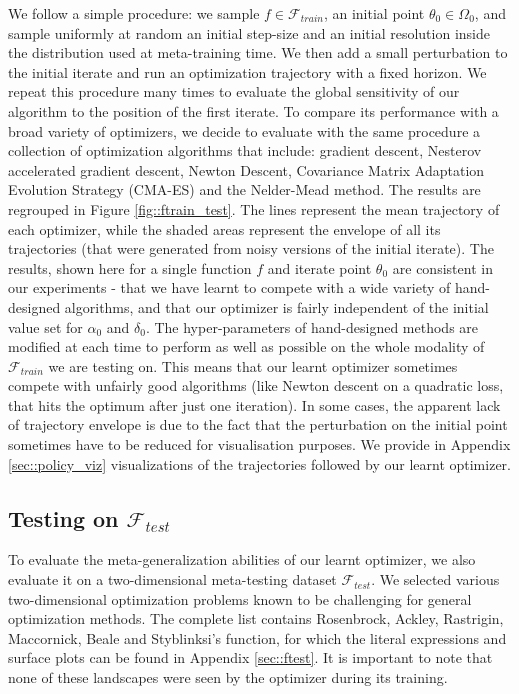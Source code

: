 {		We follow a simple procedure: we sample $f\in\mathcal{F}_{train}$, an initial point $\theta_0 \in \Omega_0$, and sample uniformly at random an initial step-size and an initial resolution inside the distribution used at meta-training time. We then add a small perturbation to the initial iterate and run an optimization trajectory with a fixed horizon. We repeat this procedure many times to evaluate the global sensitivity of our algorithm to the position of the first iterate. To compare its performance with a broad variety of optimizers, we decide to evaluate with the same procedure a collection of optimization algorithms that include: gradient descent, Nesterov accelerated gradient descent, Newton Descent, Covariance Matrix Adaptation Evolution Strategy (CMA-ES) and the Nelder-Mead method. The results are regrouped in Figure \ref{fig::ftrain_test}. The lines represent the mean trajectory of each optimizer, while the shaded areas represent the envelope of all its trajectories (that were generated from noisy versions of the initial iterate).  The results, shown here for a single function $f$ and iterate point $\theta_0$ are consistent in our experiments - that we have learnt to compete with a wide variety of hand-designed algorithms, and that our optimizer is fairly independent of the initial value set for $\alpha_0$ and $\delta_0$. The hyper-parameters of hand-designed methods are modified at each time to perform as well as possible on the whole modality of $\mathcal{F}_{train}$ we are testing on. This means that our learnt optimizer sometimes compete with unfairly good algorithms (like Newton descent on a quadratic loss, that hits the optimum after just one iteration). In some cases, the apparent lack of trajectory envelope is due to the fact that the perturbation on the initial point sometimes have to be reduced for visualisation purposes. We provide in Appendix \ref{sec::policy_viz} visualizations of the trajectories followed by our learnt optimizer. 
		
		\subsection{Testing on $\mathcal{F}_{test}$}
		To evaluate the meta-generalization abilities of our learnt optimizer, we also evaluate it on a two-dimensional meta-testing dataset $\mathcal{F}_{test}$. We selected various two-dimensional optimization problems known to be challenging for general optimization methods. The complete list contains Rosenbrock, Ackley, Rastrigin, Maccornick, Beale and Styblinksi's function, for which the literal expressions and surface plots can be found in Appendix \ref{sec::ftest}. It is important to note that none of these landscapes were seen by the optimizer during its training. 
		
}
